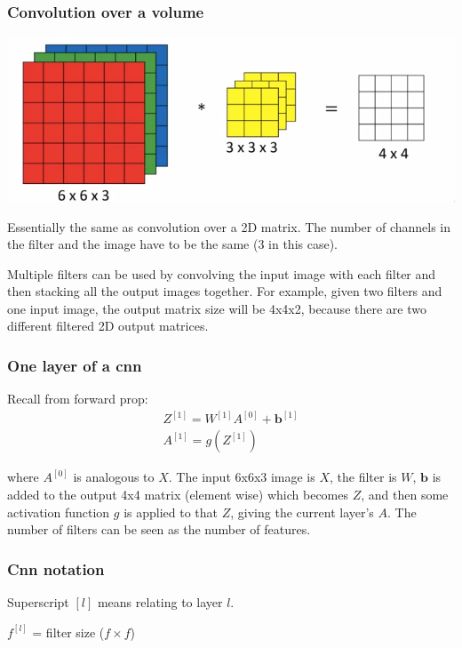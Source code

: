 \documentclass[12pt]{article}
\begin{document}
\subsubsection{Convolution over a volume}

\includegraphics[scale=.5]{images/cnn-filter-volume.png}

Essentially the same as convolution over a 2D matrix. The number of channels
in the filter and the image have to be the same (3 in this case).

Multiple filters can be used by convolving the input image with each filter and then stacking
all the output images together. For example, given two filters and one input image,
the output matrix size will be 4x4x2, because there are two different filtered 2D output
matrices.

\subsubsection{One layer of a cnn}

Recall from forward prop:
\begin{gather*}
    Z^{[1]} = W^{[1]} A^{[0]} + \bm b^{[1]}\\
    A^{[1]} = g(Z^{[1]})
\end{gather*}

where $A^{[0]}$ is analogous to $X$. The input 6x6x3 image is $X$, the filter is $W$,
$\bm b$ is added to the output 4x4 matrix (element wise) which becomes $Z$, and then some
activation function $g$ is applied to that $Z$, giving the current layer's $A$. The number
of filters can be seen as the number of features.

\subsubsection{Cnn notation}

Superscript $[l]$ means relating to layer $l$.

$f^{[l]}$ = filter size ($f \times f$)
\end{document}
